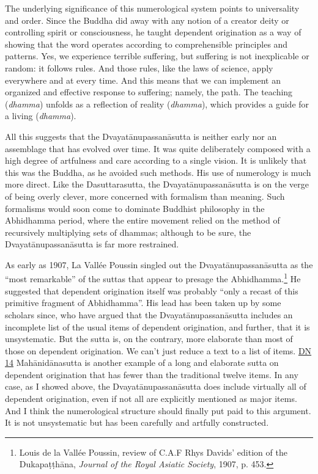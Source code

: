 \documentclass[12pt,openany]{book}%
\begin{document}
The underlying significance of this numerological system points to universality and order. Since the Buddha did away with any notion of a creator deity or controlling spirit or consciousness, he taught dependent origination as a way of showing that the word operates according to comprehensible principles and patterns. Yes, we experience terrible suffering, but suffering is not inexplicable or random: it follows rules. And those rules, like the laws of science, apply everywhere and at every time. And this means that we can implement an organized and effective response to suffering; namely, the path. The teaching (\textit{dhamma}) unfolds as a reflection of reality (\textit{dhamma}), which provides a guide for a living (\textit{dhamma}).

All this suggests that the \textsanskrit{Dvayatānupassanāsutta} is neither early nor an assemblage that has evolved over time. It was quite deliberately composed with a high degree of artfulness and care according to a single vision. It is unlikely that this was the Buddha, as he avoided such methods. His use of numerology is much more direct. Like the Dasuttarasutta, the \textsanskrit{Dvayatānupassanāsutta} is on the verge of being overly clever, more concerned with formalism than meaning. Such formalisms would soon come to dominate Buddhist philosophy in the Abhidhamma period, where the entire movement relied on the method of recursively multiplying sets of dhammas; although to be sure, the \textsanskrit{Dvayatānupassanāsutta} is far more restrained.

As early as 1907, La Vallée Poussin singled out the \textsanskrit{Dvayatānupassanāsutta} as the “most remarkable” of the suttas that appear to presage the Abhidhamma.\footnote{Louis de la Vallée Poussin, review of C.A.F Rhys Davids’ edition of the \textsanskrit{Dukapaṭṭhāna}, \textit{Journal of the Royal Asiatic Society}, 1907, p. 453. } He suggested that dependent origination itself was probably “only a recast of this primitive fragment of Abhidhamma”. His lead has been taken up by some scholars since, who have argued that the \textsanskrit{Dvayatānupassanāsutta} includes an incomplete list of the usual items of dependent origination, and further, that it is unsystematic. But the sutta is, on the contrary, more elaborate than most of those on dependent origination. We can’t just reduce a text to a list of items. \href{https://suttacentral.net/dn14/en/sujato}{DN 14} \textsanskrit{Mahānidānasutta} is another example of a long and elaborate sutta on dependent origination that has fewer than the traditional twelve items. In any case, as I showed above, the \textsanskrit{Dvayatānupassanāsutta} does include virtually all of dependent origination, even if not all are explicitly mentioned as major items. And I think the numerological structure should finally put paid to this argument. It is not unsystematic but has been carefully and artfully constructed.
\end{document}
